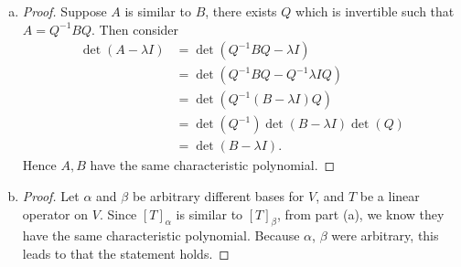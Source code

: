 \begin{Exercise}
\begin{enumerate}[(a)]
\item
\begin{proof}
Suppose $A$ is similar to $B$, there exists $Q$ which is invertible such that $A = Q^{-1} B Q$. Then consider
\begin{align*}
\det(A-\lambda I)
&= \det(Q^{-1} B Q -\lambda I) \\
&= \det(Q^{-1} B Q - Q^{-1} \lambda I Q ) \\
&= \det(Q^{-1} (B-\lambda I) Q ) \\
&= \det(Q^{-1})\det(B-\lambda I)\det(Q) \\
&= \det(B-\lambda I).
\end{align*}
Hence $A,B$ have the same characteristic polynomial.
\end{proof}

\item
\begin{proof}
Let $\alpha$ and $\beta$ be arbitrary different bases for $V$, and $T$ be a linear operator on $V$. Since $[T]_{\alpha}$ is similar to $[T]_{\beta}$, from part (a), we know they have the same characteristic polynomial. Because $\alpha$, $\beta$ were arbitrary, this leads to that the statement holds.
\end{proof}
\end{enumerate}
\end{Exercise}